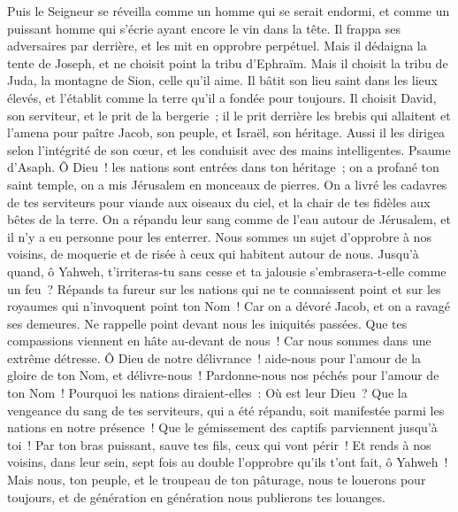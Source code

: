\begin{multicols}{2}
Puis le Seigneur se réveilla comme un homme qui se serait endormi, et comme un puissant homme qui s'écrie ayant encore le vin dans la tête.
Il frappa ses adversaires par derrière, et les mit en opprobre perpétuel.
Mais il dédaigna la tente de Joseph, et ne choisit point la tribu d'Ephraïm.
Mais il choisit la tribu de Juda, la montagne de Sion, celle qu'il aime.
Il bâtit son lieu saint dans les lieux élevés, et l'établit comme la terre qu'il a fondée pour toujours.
Il choisit David, son serviteur, et le prit de la bergerie~;
il le prit derrière les brebis qui allaitent et l'amena pour paître Jacob, son peuple, et Israël, son héritage.
Aussi il les dirigea selon l'intégrité de son cœur, et les conduisit avec des mains intelligentes.
\VerseOne{}Psaume d'Asaph. Ô Dieu~! les nations sont entrées dans ton héritage~; on a profané ton saint temple, on a mis Jérusalem en monceaux de pierres.
On a livré les cadavres de tes serviteurs pour viande aux oiseaux du ciel, et la chair de tes fidèles aux bêtes de la terre.
On a répandu leur sang comme de l'eau autour de Jérusalem, et il n'y a eu personne pour les enterrer.
Nous sommes un sujet d'opprobre à nos voisins, de moquerie et de risée à ceux qui habitent autour de nous.
Jusqu'à quand, ô Yahweh, t'irriteras-tu sans cesse et ta jalousie s'embrasera-t-elle comme un feu~?
Répands ta fureur sur les nations qui ne te connaissent point et sur les royaumes qui n'invoquent point ton Nom~!
Car on a dévoré Jacob, et on a ravagé ses demeures.
Ne rappelle point devant nous les iniquités passées. Que tes compassions viennent en hâte au-devant de nous~! Car nous sommes dans une extrême détresse.
Ô Dieu de notre délivrance~! aide-nous pour l'amour de la gloire de ton Nom, et délivre-nous~! Pardonne-nous nos péchés pour l'amour de ton Nom~!
Pourquoi les nations diraient-elles~: Où est leur Dieu~? Que la vengeance du sang de tes serviteurs, qui a été répandu, soit manifestée parmi les nations en notre présence~!
Que le gémissement des captifs parviennent jusqu'à toi~! Par ton bras puissant, sauve tes fils, ceux qui vont périr~!
Et rends à nos voisins, dans leur sein, sept fois au double l'opprobre qu'ils t'ont fait, ô Yahweh~!
Mais nous, ton peuple, et le troupeau de ton pâturage, nous te louerons pour toujours, et de génération en génération nous publierons tes louanges.

\end{multicols}
